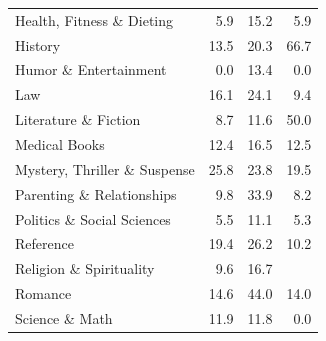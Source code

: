 \documentclass[12pt]{article}
\numberwithin{equation}{section}
\numberwithin{figure}{section}
\begin{document}
\begin{table}[]
\begin{tabular}{lrrr}
	Health, Fitness \& Dieting    & 5.9                                      & 15.2                                            & 5.9                                    \\
	History                       & 13.5                                     & 20.3                                            & 66.7                                   \\
	Humor \& Entertainment        & 0.0                                      & 13.4                                            & 0.0                                    \\
	Law                           & 16.1                                     & 24.1                                            & 9.4                                    \\
	Literature \& Fiction         & 8.7                                      & 11.6                                            & 50.0                                   \\
	Medical Books                 & 12.4                                     & 16.5                                            & 12.5                                   \\
	Mystery, Thriller \& Suspense & 25.8                                     & 23.8                                            & 19.5                                   \\
	Parenting \& Relationships    & 9.8                                      & 33.9                                            & 8.2                                    \\
	Politics \& Social Sciences   & 5.5                                      & 11.1                                            & 5.3                                    \\
	Reference                     & 19.4                                     & 26.2                                            & 10.2                                   \\
	Religion \& Spirituality      & 9.6                                      & 16.7                                            &                                        \\
	Romance                       & 14.6                                     & 44.0                                            & 14.0                                   \\
	Science \& Math               & 11.9                                     & 11.8                                            & 0.0                                    \\

\end{tabular}
\end{table}
\end{document}
